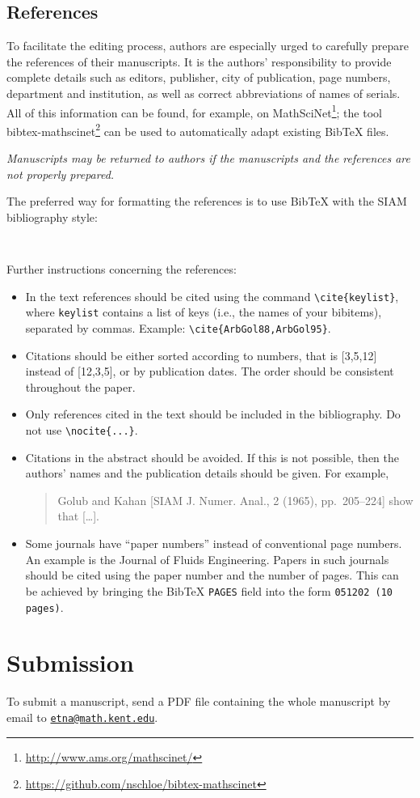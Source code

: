 \documentclass[parskip=half]{scrartcl}
\begin{document}
\subsection{References}
To facilitate the editing process, authors are especially urged to carefully
prepare the references of their manuscripts. It is the authors' responsibility
to provide complete details such as editors, publisher, city of publication,
page numbers, department and institution, as well as correct abbreviations of
names of serials. All of this information can be found, for example, on
MathSciNet\footnote{\url{http://www.ams.org/mathscinet/}}; the tool
bibtex-mathscinet\footnote{\url{https://github.com/nschloe/bibtex-mathscinet}}
can be used to automatically adapt existing BibTeX files.

\emph{Manuscripts may be returned to authors if the manuscripts and the
references are not properly prepared.}

The preferred way for formatting the references is to use BibTeX with the SIAM
bibliography style:
\begin{verbatim}


\end{verbatim}

Further instructions concerning the references:

\begin{itemize}
\item In the text references should be cited using the command
  \verb|\cite{keylist}|, where \verb|keylist| contains a list of keys (i.e.,
  the names of your bibitems), separated by commas. Example:
  \verb|\cite{ArbGol88,ArbGol95}|.

\item Citations should be either sorted according to numbers, that is [3,5,12]
  instead of [12,3,5], or by publication dates. The order should be consistent
  throughout the paper.

\item Only references cited in the text should be included in the bibliography.
  Do not use \verb|\nocite{...}|.

\item Citations in the abstract should be avoided. If this is not possible,
  then the authors' names and the publication details should be given. For
  example,
\begin{quote}
  Golub and Kahan [SIAM J. Numer. Anal., 2 (1965), pp.~205--224] show that
  [\dots].
\end{quote}

\item Some journals have ``paper numbers'' instead of conventional page
  numbers.  An example is the Journal of Fluids Engineering. Papers in such
  journals should be cited using the paper number and the number of pages. This
  can be achieved by bringing the BibTeX \texttt{PAGES} field into the form
  \texttt{051202 (10 pages)}.

\end{itemize}

\section{Submission}
To submit a manuscript, send a PDF file containing the whole manuscript by
email to \href{mailto:etna@math.kent.edu}{\nolinkurl{etna@math.kent.edu}}.
\end{document}
